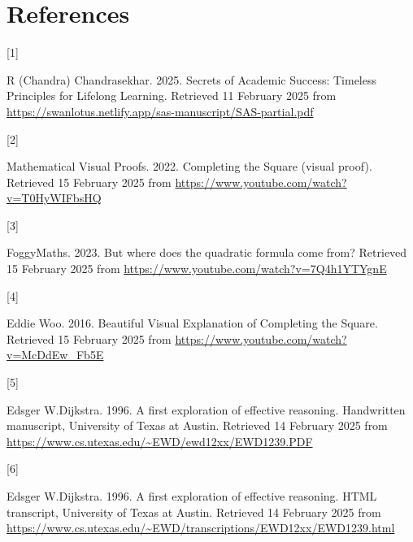 \documentclass[
  a4paper,
]{article}
\newlength{\cslhangindent}
\newlength{\csllabelwidth}
\newenvironment{CSLReferences}[2] %
 {\begin{list}{}{%
  \setlength{\itemindent}{0pt}
  \setlength{\leftmargin}{0pt}
  \setlength{\parsep}{0pt}
  \ifodd #1
   \setlength{\leftmargin}{\cslhangindent}
   \setlength{\itemindent}{-1\cslhangindent}
  \fi
  \setlength{\itemsep}{#2\baselineskip}}}
 {\end{list}}
\newcommand{\CSLLeftMargin}[1]{\parbox[t]{\csllabelwidth}{\strut#1\strut}}
\newcommand{\CSLRightInline}[1]{\parbox[t]{\linewidth - \csllabelwidth}{\strut#1\strut}}
\begin{document}
\section*{References}\label{bibliography}

\label{refs}
\begin{CSLReferences}{0}{0}
\CSLLeftMargin{{[}1{]} }%
\CSLRightInline{R (Chandra) Chandrasekhar. 2025. {Secrets of Academic
Success}: {Timeless Principles for Lifelong Learning}. Retrieved 11
February 2025 from
\url{https://swanlotus.netlify.app/sas-manuscript/SAS-partial.pdf}}

\CSLLeftMargin{{[}2{]} }%
\CSLRightInline{Mathematical Visual Proofs. 2022. {Completing the Square
(visual proof)}. Retrieved 15 February 2025 from
\url{https://www.youtube.com/watch?v=T0HyWIFbsHQ}}

\CSLLeftMargin{{[}3{]} }%
\CSLRightInline{FoggyMaths. 2023. {But where does the quadratic formula
come from?} Retrieved 15 February 2025 from
\url{https://www.youtube.com/watch?v=7Q4h1YTYgnE}}

\CSLLeftMargin{{[}4{]} }%
\CSLRightInline{Eddie Woo. 2016.{ Beautiful Visual Explanation of
Completing the Square}. Retrieved 15 February 2025 from
\url{https://www.youtube.com/watch?v=McDdEw_Fb5E}}

\CSLLeftMargin{{[}5{]} }%
\CSLRightInline{Edsger W.Dijkstra. 1996. {A first exploration of
effective reasoning}. {Handwritten manuscript, University of Texas at
Austin}. Retrieved 14 February 2025 from
\url{https://www.cs.utexas.edu/~EWD/ewd12xx/EWD1239.PDF}}

\CSLLeftMargin{{[}6{]} }%
\CSLRightInline{Edsger W.Dijkstra. 1996. {A first exploration of
effective reasoning}. {HTML transcript, University of Texas at Austin}.
Retrieved 14 February 2025 from
\url{https://www.cs.utexas.edu/~EWD/transcriptions/EWD12xx/EWD1239.html}}

\end{CSLReferences}
\end{document}
